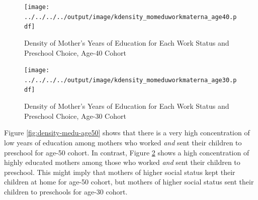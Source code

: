\begin{figure}[H] \caption{Density of Mother's Years of Education for Each Work Status and Preschool Choice, Age-40 Cohort} \label{fig:density-medu-age40}
\centering
\texttt{[image: ../../../../output/image/kdensity\_momeduworkmaterna\_age40.pdf]}
\end{figure}


\begin{figure}[H] \caption{Density of Mother's Years of Education for Each Work Status and Preschool Choice, Age-30 Cohort} \label{fig:density-medu-age30}
\centering
\texttt{[image: ../../../../output/image/kdensity\_momeduworkmaterna\_age30.pdf]}
\end{figure}


Figure \ref{fig:density-medu-age50} shows that there is a very high concentration of low years of education among mothers who worked \textit{and} sent their children to preschool for age-50 cohort. In contrast, Figure \ref{fig:density-medu-age30} shows a high concentration of highly educated mothers among those who worked \textit{and} sent their children to preschool. This might imply that mothers of higher social status kept their children at home for age-50 cohort, but mothers of higher social status sent their children to preschools for age-30 cohort. 




